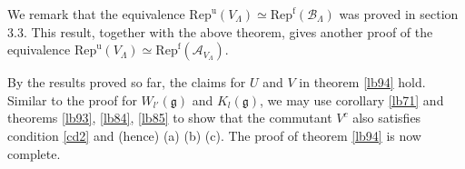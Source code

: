 \documentclass[12pt,a4paper]{article}
\theoremstyle{definition}
\theoremstyle{plain}
\newcommand{\mc}{\mathcal}
\newcommand{\Repu}{\mathrm{Rep}^{\mathrm u}}
\newcommand{\gk}{\mathfrak g}
\newcommand{\Repf}{\mathrm{Rep}^{\mathrm f}}
\numberwithin{equation}{subsection}
\begin{document}
We remark that the equivalence $\Repu(V_\Lambda)\simeq \Repf(\mc B_\Lambda)$ was proved in \cite{Bis18} section 3.3. This result, together with the above theorem, gives another proof of the equivalence $\Repu(V_\Lambda)\simeq \Repf(\mc A_{V_\Lambda})$.




By the results proved so far, the claims for $U$ and $V$ in theorem \ref{lb94} hold. Similar to the proof for $W_{l'}(\gk)$ and $K_l(\gk)$, we may use corollary \ref{lb71} and theorems \ref{lb93}, \ref{lb84}, \ref{lb85} to show that the commutant $V^c$ also satisfies condition \ref{cd2} and (hence) (a) (b) (c). The proof of theorem \ref{lb94} is now complete.





\newpage
\end{document}
